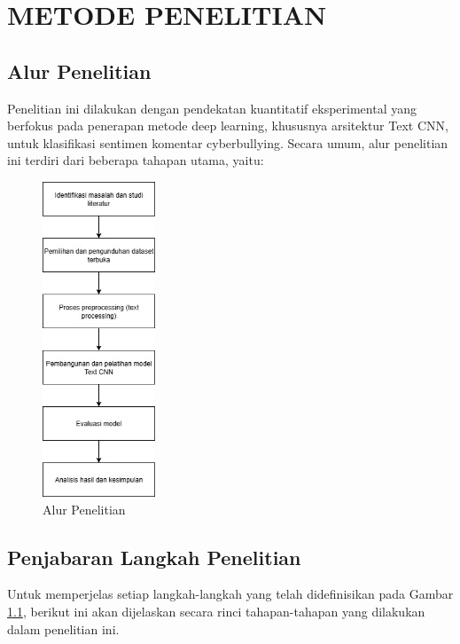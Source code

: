 \newpage
\chapter{METODE PENELITIAN} \label{Bab III}

\section{Alur Penelitian} \label{III.Alur}
Penelitian ini dilakukan dengan pendekatan kuantitatif eksperimental yang berfokus pada penerapan metode deep learning, khususnya arsitektur Text CNN, untuk klasifikasi sentimen komentar cyberbullying. Secara umum, alur penelitian ini terdiri dari beberapa tahapan utama, yaitu: \par

\begin{figure}[H] %
    \centering
    \includegraphics[width=0.3\textwidth]{figure/sistematika-penelitian.jpg}
    \caption{Alur Penelitian}
    \label{fig:3.alur}
\end{figure}

\section{Penjabaran Langkah Penelitian} \label{III.Jabar Alur}
Untuk memperjelas setiap langkah-langkah yang telah didefinisikan pada Gambar \ref{fig:3.alur}, berikut ini akan dijelaskan secara rinci tahapan-tahapan yang dilakukan dalam penelitian ini.


